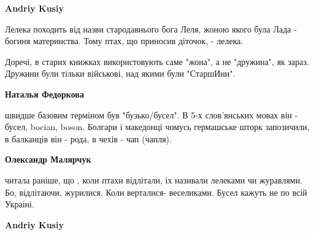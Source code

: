 \begin{itemize}
\begin{itemize}
 
\textbf{Andriy Kusiy} 

Лелека походить від назви стародавнього бога Леля, жоною якого була Лада -
богиня материнства. Тому птах, що приносив діточок, - лелека.


 

Доречі, в старих книжках використовують саме "жона", а не "дружина", як зараз.
Дружини були тільки військові, над якими були "СтаршИни".


 
\textbf{Наталья Федоркова} 

швидше базовим терміном був "бузько/бусел". В 5-х слов'янських мовах він -
бусел, bocian, boson. Болгари і македонці чомусь гермашське шторк запозичили, в
балканців він - рода, в чехів - чап (чапля).


 
\textbf{Олександр Малярчук} 

читала раніше, що , коли птахи відлітали, іх називали лелеками чи журавлями. Бо,
відлітаючи, журилися. Коли верталися- веселиками. Бусел кажуть не по всій
Украіні.

 
\textbf{Andriy Kusiy} 


\end{itemize}
\end{itemize}
